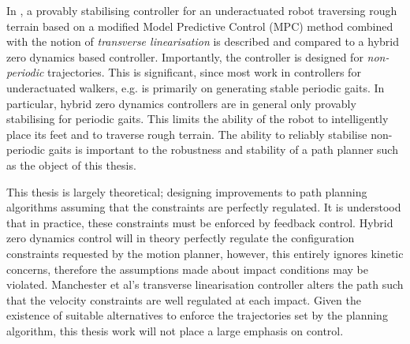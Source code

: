 In \cite{manchester2011stable}, a provably stabilising controller for an underactuated robot traversing rough terrain based on a modified Model Predictive Control (MPC) method combined with the notion of \textit{transverse linearisation} is described and compared to a hybrid zero dynamics based controller. Importantly, the controller is designed for \textit{non-periodic} trajectories. This is significant, since most work in controllers for underactuated walkers, e.g. \cite{martin2014design, sreenath2011compliant, raibert2008bigdog} is primarily on generating stable periodic gaits. In particular, hybrid zero dynamics controllers are in general only provably stabilising for periodic gaits. This limits the ability of the robot to intelligently place its feet and to traverse rough terrain. The ability to reliably stabilise non-periodic gaits is important to the robustness and stability of a path planner such as the object of this thesis. %


This thesis is largely theoretical; designing improvements to path planning algorithms assuming that the constraints are perfectly regulated. It is understood that in practice, these constraints must be enforced by feedback control. Hybrid zero dynamics control will in theory perfectly regulate the configuration constraints requested by the motion planner, however, this entirely ignores kinetic concerns, therefore the assumptions made about impact conditions may be violated. Manchester et al's transverse linearisation controller alters the path such that the velocity constraints are well regulated at each impact. Given the existence of suitable alternatives to enforce the trajectories set by the planning algorithm, this thesis work will not place a large emphasis on control.
